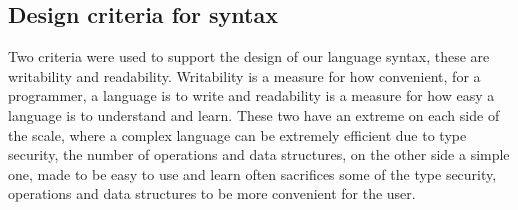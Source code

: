 \subsection{Design criteria for syntax}
Two criteria were used to support the design of our language syntax, these are writability and readability. Writability is a measure for how convenient, for a programmer, a language is to write and readability is a measure for how easy a language is to understand and learn. These two have an extreme on each side of the scale, where a complex language can be extremely efficient due to type security, the number of operations and data structures, on the other side a simple one, made to be easy to use and learn often sacrifices some of the type security, operations and data structures to be more convenient for the user.
\begin{comment}
\begin{tabular}{l l l}
$< \texttt{if\_stmt}>$ & $\rightarrow$ $ \textbf{\texttt{if}} \; ( < \texttt{expression} > ) \;  < \texttt{statement} > \; [ \textbf{\texttt{else}} \; < \texttt{statement} > ]$
\end{tabular}

With use of \ac{bnf} the statement would be desriped \\

\begin{tabular}{l l l}
$< \texttt{if\_stmt}>$ & $\rightarrow$ &  $\textbf{\texttt{if}}  \; ( < \texttt{expression} > ) \;  < \texttt{statement} >$ \\
 & $|$ & $ \textbf{\texttt{if}} \; ( < \texttt{expression} > ) \;  < \texttt{statement} > \; \textbf{\texttt{else}} \; < \texttt{statement} > $
\end{tabular}
\end{comment}
